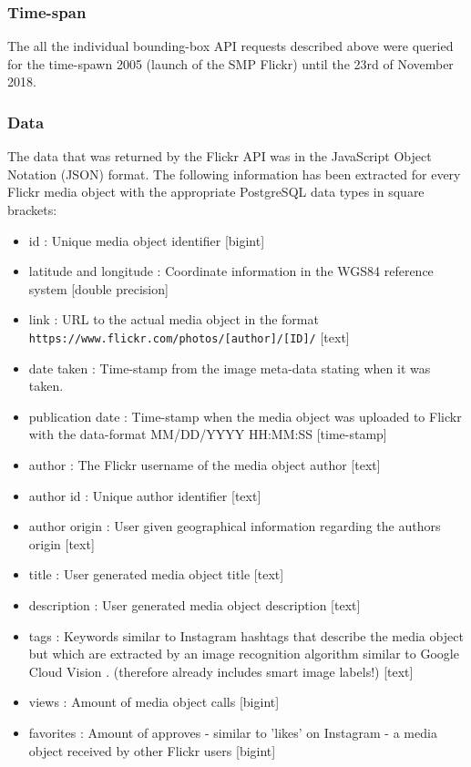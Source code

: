 \subsubsection{Time-span} \label{flickr_timespan}
The all the individual bounding-box API requests described above were queried for the time-spawn 2005 (launch of the SMP Flickr) until the 23rd of November 2018. 
\subsubsection{Data} \label{flickr_data}
The data that was returned by the Flickr API was in the JavaScript Object Notation (JSON) format. The following information has been extracted for every Flickr media object with the appropriate PostgreSQL data types in square brackets:\\

\begin{itemize}
    \item id : Unique media object identifier [bigint]
    \item latitude and longitude : Coordinate information in the WGS84 reference system [double precision]
    \item link : URL to the actual media object in the format \texttt{https://www.flickr.com/photos/[author]/[ID]/} [text]
    \item date taken : Time-stamp from the image meta-data stating when it was taken. 
    \item publication date : Time-stamp when the media object was uploaded to Flickr with the data-format MM/DD/YYYY HH:MM:SS [time-stamp]
    \item author : The Flickr username of the media object author [text]
    \item author id : Unique author identifier [text] 
    \item author origin : User given geographical information regarding the authors origin [text]
    \item title : User generated media object title [text]
    \item description : User generated media object description [text]
    \item tags : Keywords similar to Instagram hashtags that describe the media object but which are extracted by an image recognition algorithm similar to Google Cloud Vision \parencite{Flickr2019}. (therefore already includes smart image labels!) [text]
    \item views : Amount of media object calls [bigint]
    \item favorites : Amount of approves - similar to 'likes' on Instagram - a media object received by other Flickr users [bigint]
\end{itemize}


